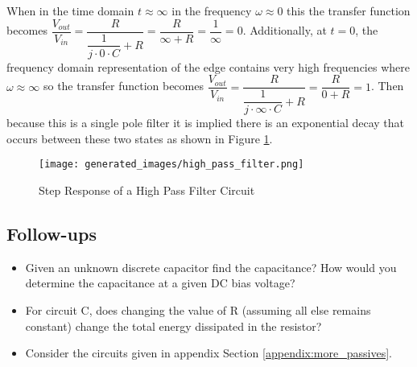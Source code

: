 \documentclass[main.tex]{subfiles}
\begin{document}
\newnoindentpara When in the time domain $t \approx \infty$ in the frequency $\omega \approx 0$ this the transfer function becomes $\dfrac{V_{out}}{V_{in}} = \dfrac{R}{\dfrac{1}{j \cdot 0 \cdot C} + R} = \dfrac{R}{\infty + R} = \dfrac{1}{\infty} = 0$. Additionally, at $t = 0$, the frequency domain representation of the edge contains very high frequencies where $\omega \approx \infty$ so the transfer function becomes $\dfrac{V_{out}}{V_{in}} = \dfrac{R}{\dfrac{1}{j \cdot \infty \cdot C} + R} = \dfrac{R}{0 + R} = 1$. Then because this is a single pole filter it is implied there is an exponential decay that occurs between these two states as shown in Figure \ref{fig:step-response-high-pass-filter}.

\begin{figure}[H]
    \centering
    \texttt{[image: generated\_images/high\_pass\_filter.png]}
    \caption{Step Response of a High Pass Filter Circuit}
    \label{fig:step-response-high-pass-filter}
\end{figure}


\subsection{Follow-ups}
\begin{itemize}
    \item Given an unknown discrete capacitor find the capacitance? How would you determine the capacitance at a given DC bias voltage? %
    \item For circuit C, does changing the value of R (assuming all else remains constant) change the total energy dissipated in the resistor? %
    \item Consider the circuits given in appendix Section \ref{appendix:more_passives}. %
\end{itemize}
\end{document}
